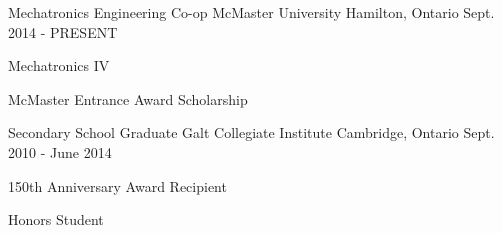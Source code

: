 
\begin{cventries}

  \cventry
    {Mechatronics Engineering Co-op} %
    {McMaster University} %
    {Hamilton, Ontario} %
    {Sept. 2014 - PRESENT} %
    {
      \begin{cvitems} %
        \item {Mechatronics IV}
        \item {McMaster Entrance Award Scholarship}
      \end{cvitems}
    }

\cventry
    {Secondary School Graduate} %
    {Galt Collegiate Institute} %
    {Cambridge, Ontario} %
    {Sept. 2010 - June 2014} %
    {
      \begin{cvitems} %
        \item {150th Anniversary Award Recipient}
        \item {Honors Student}
      \end{cvitems}
    }

\end{cventries}

